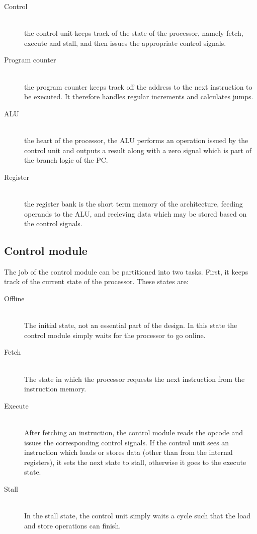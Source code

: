 \begin{description}
  \item[Control] \hfill \\
  the control unit keeps track of the state of the processor, namely fetch, execute and stall, and then issues the appropriate control signals.  
  \item[Program counter] \hfill \\
  the program counter keeps track off the address to the next instruction to be executed. It therefore handles regular increments and calculates jumps.
  \item[ALU] \hfill \\
  the heart of the processor, the ALU performs an operation issued by the control unit and outputs a result along with a zero signal which is part of the branch logic of the PC.
  \item[Register] \hfill \\
  the register bank is the short term memory of the architecture, feeding operands to the ALU, and recieving data which may be stored based on the control signals.
\end{description}

\subsection{Control module}
The job of the control module can be partitioned into two tasks. First, it keeps track of the current state of the processor.
These states are:
\begin{description}
  \item[Offline] \hfill \\
  The initial state, not an essential part of the design. In this state the control module simply waits for the processor to go online.
  \item[Fetch] \hfill \\
  The state in which the processor requests the next instruction from the instruction memory.
  \item[Execute] \hfill \\
  After fetching an instruction, the control module reads the opcode and issues the corresponding control signals.
  If the control unit sees an instruction which loads or stores data (other than from the internal registers), it sets the next state to stall, otherwise it goes to the execute state.
  \item[Stall] \hfill \\
  In the stall state, the control unit simply waits a cycle such that the load and store operations can finish.
\end{description}

